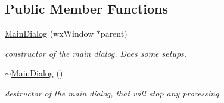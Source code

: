 \subsection*{Public Member Functions}
\begin{DoxyCompactItemize}
\item 
\hyperlink{classMainDialog_ae4bae8f15a5729712a7fd4effd078063}{Main\+Dialog} (wx\+Window $\ast$parent)
\begin{DoxyCompactList}\small\item\em constructor of the main dialog. Does some setups. \end{DoxyCompactList}\item 
\hyperlink{classMainDialog_a33d8e8327530b31387876b19f6542cc5}{$\sim$\+Main\+Dialog} ()
\begin{DoxyCompactList}\small\item\em destructor of the main dialog, that will stop any processing \end{DoxyCompactList}\end{DoxyCompactItemize}
